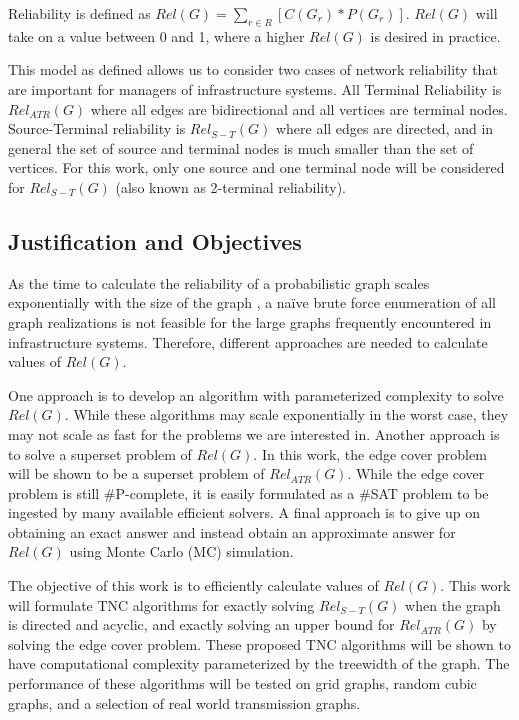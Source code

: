 Reliability is defined as \(Rel(G) = \sum_{r \in R} [C(G_r)*P(G_r)]\). \(Rel(G)\) will take on a value between 0 and 1, where a higher \(Rel(G)\) is desired in practice.

This model as defined allows us to consider two cases of network reliability that are important for managers of infrastructure systems. All Terminal Reliability is \(Rel_{ATR}(G)\) where all edges are bidirectional and all vertices are terminal nodes. Source-Terminal reliability is \(Rel_{S-T}(G)\) where all edges are directed, and in general the set of source and terminal nodes is much smaller than the set of vertices. For this work, only one source and one terminal node will be considered for \(Rel_{S-T}(G)\) (also known as 2-terminal reliability).

\hypertarget{justification-and-objectives}{%
\subsection{Justification and Objectives}\label{justification-and-objectives}}

As the time to calculate the reliability of a probabilistic graph scales exponentially with the size of the graph \cite{valiant1979complexity}, a naïve brute force enumeration of all graph realizations is not feasible for the large graphs frequently encountered in infrastructure systems. Therefore, different approaches are needed to calculate values of \(Rel(G)\).

One approach is to develop an algorithm with parameterized complexity to solve \(Rel(G)\). While these algorithms may scale exponentially in the worst case, they may not scale as fast for the problems we are interested in. Another approach is to solve a superset problem of \(Rel(G)\). In this work, the edge cover problem will be shown to be a superset problem of \(Rel_{ATR}(G)\). While the edge cover problem is still \#P-complete, it is easily formulated as a \#SAT problem to be ingested by many available efficient solvers. A final approach is to give up on obtaining an exact answer and instead obtain an approximate answer for \(Rel(G)\) using Monte Carlo (MC) simulation.

The objective of this work is to efficiently calculate values of \(Rel(G)\). This work will formulate TNC algorithms for exactly solving \(Rel_{S-T}(G)\) when the graph is directed and acyclic, and exactly solving an upper bound for \(Rel_{ATR}(G)\) by solving the edge cover problem. These proposed TNC algorithms will be shown to have computational complexity parameterized by the treewidth of the graph. The performance of these algorithms will be tested on grid graphs, random cubic graphs, and a selection of real world transmission graphs.

